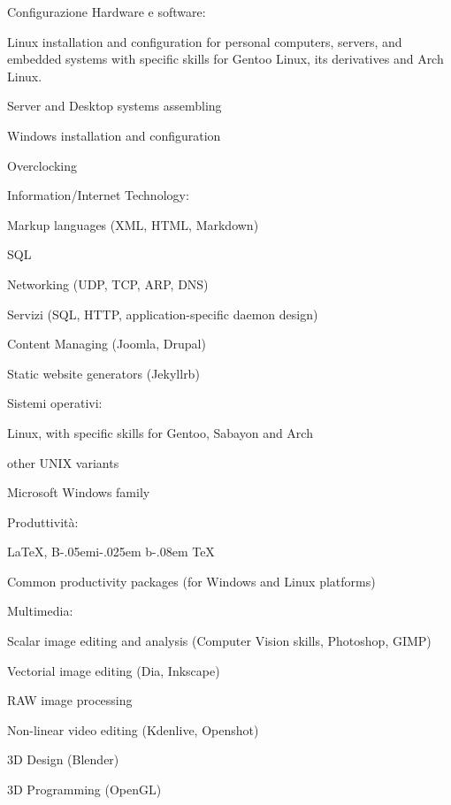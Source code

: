 \documentclass[10pt]{article}
\newenvironment{innerlist}[1][\enskip\textbullet]%
        {\begin{compactitem}[#1]}{\end{compactitem}}
\newcommand{\halfblankline}{\quad\vspace{-0.5\baselineskip}\pagebreak[3]}
\providecommand\BibTeX{{B\kern-.05em{\sc i\kern-.025em b}\kern-.08em
    \TeX}}
\begin{document}
Configurazione Hardware e software:
\begin{innerlist}
    \item Linux installation and configuration for personal computers, servers, and embedded systems with specific skills for Gentoo Linux, its derivatives and Arch Linux.
    \item Server and Desktop systems assembling
    \item Windows installation and configuration
    \item Overclocking
\end{innerlist}
\halfblankline

Information/Internet Technology:
\begin{innerlist}
    \item Markup languages (XML, HTML, Markdown)
    \item SQL
    \item Networking (UDP, TCP, ARP, DNS)
    \item Servizi (SQL, HTTP, application-specific daemon design)
    \item Content Managing (Joomla, Drupal)
    \item Static website generators (Jekyllrb)
\end{innerlist}
\halfblankline

Sistemi operativi:
\begin{innerlist}
    \item Linux, with specific skills for Gentoo, Sabayon and Arch
    \item other UNIX variants
    \item Microsoft Windows family
\end{innerlist}
\halfblankline

Produttività:
\begin{innerlist}
    \item \LaTeX{}, \BibTeX{}
    \item Common productivity packages (for Windows and Linux platforms)
\end{innerlist}
\halfblankline

Multimedia:
\begin{innerlist}
    \item Scalar image editing and analysis (Computer Vision skills, Photoshop, GIMP)
    \item Vectorial image editing (Dia, Inkscape)
    \item RAW image processing
    \item Non-linear video editing (Kdenlive, Openshot)
    \item 3D Design (Blender)
    \item 3D Programming (OpenGL)
\end{innerlist}
\end{document}
